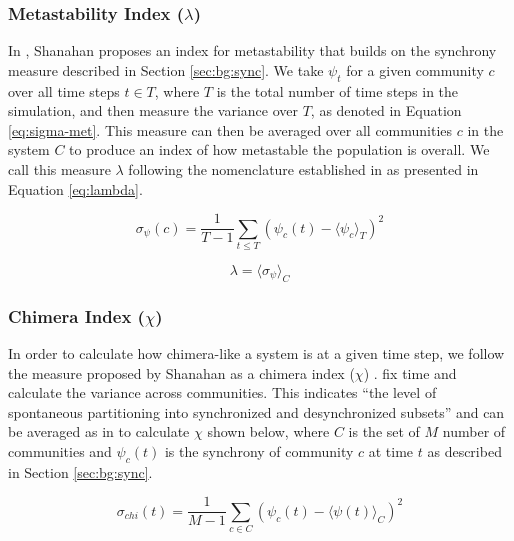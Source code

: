 \documentclass[a4paper,11pt]{article}
\begin{document}
\subsubsection{Metastability Index ($\lambda$)}
\label{sec:bg:lambda}

In \cite{Shanahan2010}, Shanahan proposes an index for metastability that builds on the synchrony measure described in Section \ref{sec:bg:sync}. We take $\psi_t$ for a given community $c$ over all time steps $t \in T$, where $T$ is the total number of time steps in the simulation, and then measure the variance over $T$, as denoted in Equation \ref{eq:sigma-met}. This measure can then be averaged over all communities $c$ in the system $C$ to produce an index of how metastable the population is overall. We call this measure $\lambda$ following the nomenclature established in \cite{Shanahan2010} as presented in Equation \ref{eq:lambda}.

\begin{equation} \label{eq:sigma-met}
\sigma_{\psi}(c) = \frac{1}{T - 1} \sum_{t \leq T }(\psi_{c}(t) - \langle \psi_{c}\rangle_T)^2
\end{equation}

\begin{equation} \label{eq:lambda}
\lambda = \langle \sigma_{\psi} \rangle_C
\end{equation}

\subsubsection{Chimera Index ($\chi$)}
\label{sec:bg:chi}

In order to calculate how chimera-like a system is at a given time step, we follow the measure proposed by Shanahan as a chimera index ($\chi$) \cite{Shanahan2010}.  fix time and calculate the variance across communities. This indicates ``the level of spontaneous partitioning into synchronized and desynchronized subsets'' \cite{Bhowmik2013} and can be averaged as in \cite{Shanahan2010} to calculate $\chi$ shown below, where $C$ is the set of $M$ number of communities and $\psi_c(t)$ is the synchrony of community $c$ at time $t$ as described in Section \ref{sec:bg:sync}.

\begin{equation} \label{eq:var-sync}
\sigma_{chi}(t) = \frac{1}{M - 1}\sum_{c \in C}(\psi_c(t) - \langle \psi(t) \rangle_C)^2
\end{equation}
\end{document}
